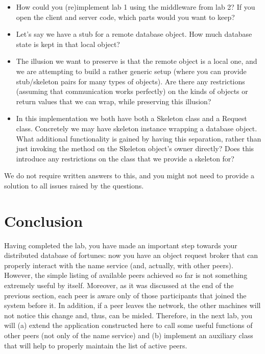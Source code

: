 \documentclass[a4paper]{article}
\begin{document}
\begin{itemize}
  \item How could you (re)implement lab 1 using the middleware from
    lab 2? If you open the client and server code, which parts would
    you want to keep?

  \item Let's say we have a stub for a remote database object. How
    much database state is kept in that local object?
    
  \item The illusion we want to preserve is that the remote object is
    a local one, and we are attempting to build a rather generic setup
    (where you can provide stub/skeleton pairs for many types of
    objects). Are there any restrictions (assuming that communication
    works perfectly) on the kinds of objects or return values that we
    can wrap, while preserving this illusion?
  
  \item In this implementation we both have both a Skeleton class and
    a Request class. Concretely we may have skeleton instance wrapping
    a database object. What additional functionality is gained by
    having this separation, rather than just invoking the method on
    the Skeleton object's owner directly? Does this introduce any
    restrictions on the class that we provide a skeleton for?

\end{itemize}

We do not require written answers to this, and you might not need to
provide a solution to all issues raised by the questions.



\section{Conclusion}
Having completed the lab, you have made an important step towards your
distributed database of fortunes: now you have an object request broker that can
properly interact with the name service (and, actually, with other peers).
However, the simple listing of available peers achieved so far is not something
extremely useful by itself. Moreover, as it was discussed at the end of the
previous section, each peer is aware only of those participants that joined the
system before it. In addition, if a peer leaves the network, the other machines
will not notice this change and, thus, can be misled. Therefore, in the next
lab, you will (a) extend the application constructed here to call some useful
functions of other peers (not only of the name service) and (b) implement an
auxiliary class that will help to properly maintain the list of active peers.

\printbibliography
\end{document}
